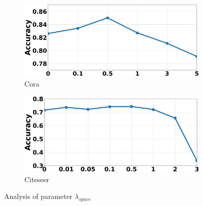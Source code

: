 \documentclass[accepted]{uai2021} %
\begin{document}
\begin{figure}[t]
     \centering
     \begin{subfigure}[b]{0.235\textwidth}
         \centering
         \includegraphics[width=1\columnwidth]{cora_liksensi_fig.png}
         \caption{\small{Cora}}
         \label{fig:consensi_cora}
     \end{subfigure}
     \hfill
     \begin{subfigure}[b]{0.235\textwidth}
         \centering
         \includegraphics[width=1\columnwidth]{citeseer_liksensi_fig.png}
         \caption{\small{Citeseer}}
         \label{fig:consensi_cite}
     \end{subfigure}
\caption{Analysis of parameter $\lambda_{space}$}
\label{fig:ConSensi}
\end{figure}
\end{document}
